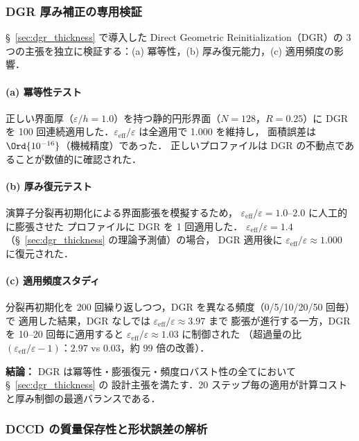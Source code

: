\subsubsection{DGR 厚み補正の専用検証}
\label{sec:verify_dgr}

§~\ref{sec:dgr_thickness} で導入した Direct Geometric Reinitialization（DGR）の
3 つの主張を独立に検証する：(a) 冪等性，(b) 厚み復元能力，(c) 適用頻度の影響．

\paragraph{(a) 冪等性テスト}
正しい界面厚（$\varepsilon/h = 1.0$）を持つ静的円形界面（$N = 128$，$R = 0.25$）に
DGR を 100 回連続適用した．$\varepsilon_{\mathrm{eff}}/\varepsilon$ は全適用で 1.000 を維持し，
面積誤差は $\Ord{10^{-16}}$（機械精度）であった．
正しいプロファイルは DGR の不動点であることが数値的に確認された．

\paragraph{(b) 厚み復元テスト}
演算子分裂再初期化による界面膨張を模擬するため，
$\varepsilon_{\mathrm{eff}}/\varepsilon = 1.0$--$2.0$ に人工的に膨張させた
プロファイルに DGR を 1 回適用した．
$\varepsilon_{\mathrm{eff}}/\varepsilon = 1.4$（§~\ref{sec:dgr_thickness} の理論予測値）の場合，
DGR 適用後に $\varepsilon_{\mathrm{eff}}/\varepsilon \approx 1.000$ に復元された．

\paragraph{(c) 適用頻度スタディ}
分裂再初期化を 200 回繰り返しつつ，DGR を異なる頻度（0/5/10/20/50 回毎）で
適用した結果，DGR なしでは $\varepsilon_{\mathrm{eff}}/\varepsilon \approx 3.97$ まで
膨張が進行する一方，DGR を 10--20 回毎に適用すると
$\varepsilon_{\mathrm{eff}}/\varepsilon \approx 1.03$ に制御された
（超過量の比 $(\varepsilon_{\mathrm{eff}}/\varepsilon - 1)$：$2.97$ vs $0.03$，約 99 倍の改善）．

\noindent\textbf{結論：}
DGR は冪等性・膨張復元・頻度ロバスト性の全てにおいて §~\ref{sec:dgr_thickness} の
設計主張を満たす．20 ステップ毎の適用が計算コストと厚み制御の最適バランスである．

\subsubsection{DCCD の質量保存性と形状誤差の解析}
\label{sec:verify_dccd_conservation}

